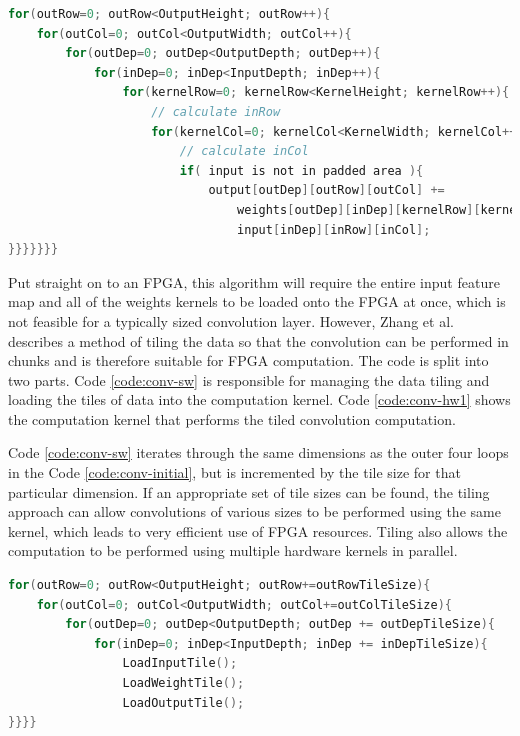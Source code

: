 \documentclass[12pt]{article}
\begin{document}
\renewcommand{\lstlistingname}{Code}
\begin{lstlisting}[caption=Basic Convolution, label=code:conv-initial, language=C, float=ht]
for(outRow=0; outRow<OutputHeight; outRow++){
	for(outCol=0; outCol<OutputWidth; outCol++){
		for(outDep=0; outDep<OutputDepth; outDep++){
			for(inDep=0; inDep<InputDepth; inDep++){      
				for(kernelRow=0; kernelRow<KernelHeight; kernelRow++){        
					// calculate inRow
					for(kernelCol=0; kernelCol<KernelWidth; kernelCol++){          
						// calculate inCol
						if( input is not in padded area ){
							output[outDep][outRow][outCol] +=
								weights[outDep][inDep][kernelRow][kernelCol] *
								input[inDep][inRow][inCol];
}}}}}}}
\end{lstlisting} 

Put straight on to an FPGA, this algorithm will require the entire input feature map and all of the weights kernels to be loaded onto the FPGA at once, which is not feasible for a typically sized convolution layer. However, Zhang et al. describes a method of tiling the data so that the convolution can be performed in chunks and is therefore suitable for FPGA computation. The code is split into two parts. Code \ref{code:conv-sw}  is responsible for managing the data tiling and loading the tiles of data into the computation kernel. Code \ref{code:conv-hw1} shows the computation kernel that performs the tiled convolution computation.

Code \ref{code:conv-sw} iterates through the same dimensions as the outer four loops in the Code \ref{code:conv-initial}, but is incremented by the tile size for that particular dimension. If an appropriate set of tile sizes can be found, the tiling approach can allow convolutions of various sizes to be performed using the same kernel, which leads to very efficient use of FPGA resources. Tiling also allows the computation to be performed using multiple hardware kernels in parallel.

\renewcommand{\lstlistingname}{Code}
\begin{lstlisting}[caption=External Data Transfer, label=code:conv-sw, language=C, float=ht]
for(outRow=0; outRow<OutputHeight; outRow+=outRowTileSize){
	for(outCol=0; outCol<OutputWidth; outCol+=outColTileSize){
		for(outDep=0; outDep<OutputDepth; outDep += outDepTileSize){
			for(inDep=0; inDep<InputDepth; inDep += inDepTileSize){
				LoadInputTile();
				LoadWeightTile();
				LoadOutputTile();
}}}}
\end{lstlisting} 
\end{document}
